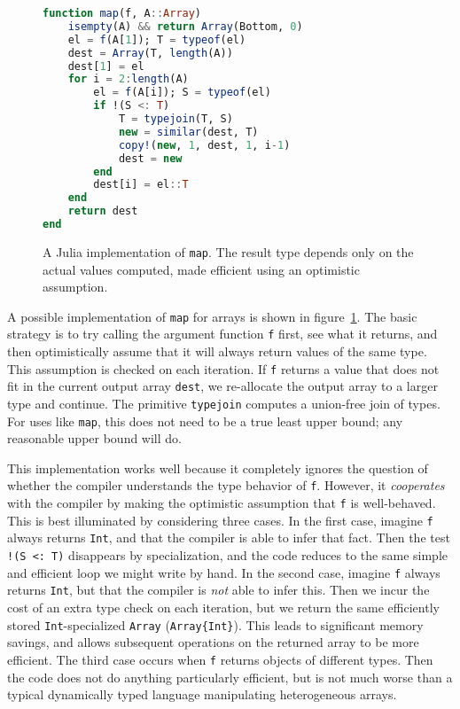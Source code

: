 \begin{singlespace}
\begin{figure}
\begin{lstlisting}[language=julia]
function map(f, A::Array)
    isempty(A) && return Array(Bottom, 0)
    el = f(A[1]); T = typeof(el)
    dest = Array(T, length(A))
    dest[1] = el
    for i = 2:length(A)
        el = f(A[i]); S = typeof(el)
        if !(S <: T)
            T = typejoin(T, S)
            new = similar(dest, T)
            copy!(new, 1, dest, 1, i-1)
            dest = new
        end
        dest[i] = el::T
    end
    return dest
end
\end{lstlisting}
  \caption[An implementation of \texttt{map}]{
    A Julia implementation of \texttt{map}.
    The result type depends only on the actual values computed, made
    efficient using an optimistic assumption.
  }
  \label{fig:mapimpl}
\end{figure}
\end{singlespace}

A possible implementation of \texttt{map} for arrays is shown in
figure~\ref{fig:mapimpl}.
The basic strategy is to try calling the argument function \texttt{f}
first, see what it returns, and then optimistically assume that it
will always return values of the same type.
This assumption is checked on each iteration.
If \texttt{f} returns a value that does not fit in the current output
array \texttt{dest}, we re-allocate the output array to a larger
type and continue.
The primitive \texttt{typejoin} computes a union-free join of types.
For uses like \texttt{map}, this does not need to be a true least
upper bound; any reasonable upper bound will do.

This implementation works well because it completely ignores the
question of whether the compiler understands the type behavior of
\texttt{f}.
However, it \emph{cooperates} with the compiler by making the
optimistic assumption that \texttt{f} is well-behaved.
This is best illuminated by considering three cases.
In the first case, imagine \texttt{f} always returns \texttt{Int},
and that the compiler is able to infer that fact.
Then the test \texttt{!(S <:\ T)} disappears by specialization,
and the code reduces to the same simple and efficient loop we
might write by hand.
In the second case, imagine \texttt{f} always returns \texttt{Int},
but that the compiler is \emph{not} able to infer this.
Then we incur the cost of an extra type check on each iteration,
but we return the same efficiently stored \texttt{Int}-specialized
\texttt{Array} (\texttt{Array\{Int\}}).
This leads to significant memory savings, and allows subsequent
operations on the returned array to be more efficient.
The third case occurs when \texttt{f} returns objects of different
types.
Then the code does not do anything particularly efficient, but is
not much worse than a typical dynamically typed language manipulating
heterogeneous arrays.

